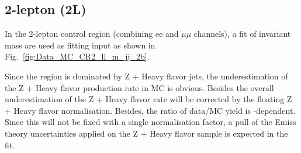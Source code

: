 \subsection{2-lepton (2L)}
\par In the 2-lepton control region (combining ee and $\mu\mu$ channels), a fit of invariant mass are used as fitting input as shown in Fig.~\ref{fig:Data_MC_CR2_ll_m_jj_2b}. 
\par Since the region is dominated by Z + Heavy flavor jets, the underestimation of the Z + Heavy flavor production rate in MC is obvious. Besides the overall underestimation of 
the Z + Heavy flavor rate will be corrected by the floating Z + Heavy flavor normalisation.
Besides, the ratio of data/MC yield is \met-dependent. Since this will not be fixed with a single normalisation factor, a pull of the Emiss theory uncertainties applied on the
Z + Heavy flavor sample is expected in the fit.
